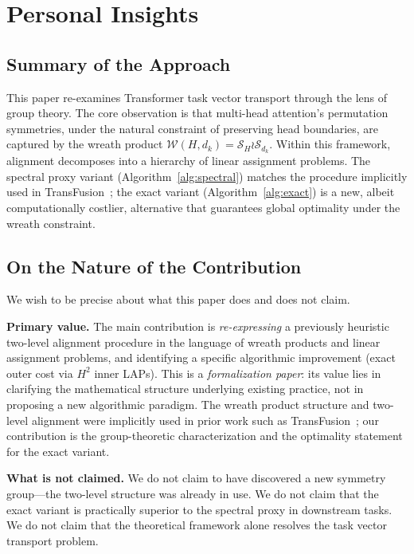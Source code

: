 \section{Personal Insights}
\label{sec:insights}

\subsection{Summary of the Approach}

This paper re-examines Transformer task vector transport through the lens of group theory. The core observation is that multi-head attention's permutation symmetries, under the natural constraint of preserving head boundaries, are captured by the wreath product $\mathcal{W}(H,d_k) = \mathcal{S}_H \wr \mathcal{S}_{d_k}$. Within this framework, alignment decomposes into a hierarchy of linear assignment problems. The spectral proxy variant (Algorithm~\ref{alg:spectral}) matches the procedure implicitly used in TransFusion~\cite{Rinaldi2025}; the exact variant (Algorithm~\ref{alg:exact}) is a new, albeit computationally costlier, alternative that guarantees global optimality under the wreath constraint.

\subsection{On the Nature of the Contribution}

We wish to be precise about what this paper does and does not claim.

\textbf{Primary value.} The main contribution is \emph{re-expressing} a previously heuristic two-level alignment procedure in the language of wreath products and linear assignment problems, and identifying a specific algorithmic improvement (exact outer cost via $H^2$ inner LAPs). This is a \emph{formalization paper}: its value lies in clarifying the mathematical structure underlying existing practice, not in proposing a new algorithmic paradigm. The wreath product structure and two-level alignment were implicitly used in prior work such as TransFusion~\cite{Rinaldi2025}; our contribution is the group-theoretic characterization and the optimality statement for the exact variant.

\textbf{What is not claimed.} We do not claim to have discovered a new symmetry group---the two-level structure was already in use. We do not claim that the exact variant is practically superior to the spectral proxy in downstream tasks. We do not claim that the theoretical framework alone resolves the task vector transport problem.

